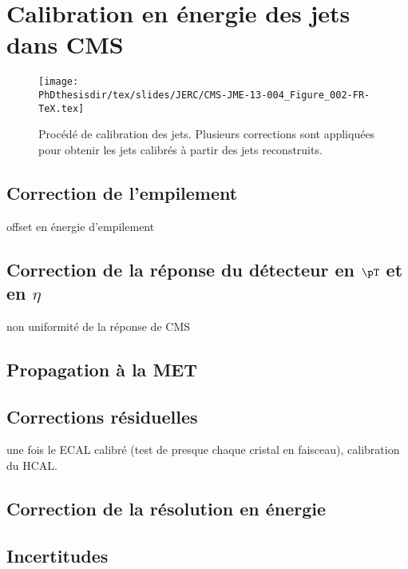 \section{Calibration en énergie des jets dans CMS}\label{chapter-JERC-section-CMS}

\begin{figure}[h]
\centering
\texttt{[image: \\PhDthesisdir/tex/slides/JERC/CMS-JME-13-004\_Figure\_002-FR-TeX.tex]}
\caption{Procédé de calibration des jets. Plusieurs corrections sont appliquées pour obtenir les jets calibrés à partir des jets reconstruits.}
\label{fig-CMS-JME-13-004_Figure_002-FR-TeX}
\end{figure}

\subsection{Correction de l'empilement}\label{chapter-JERC-section-CMS-subsec-PU}
offset en énergie d'empilement

\subsection{Correction de la réponse du détecteur en $\pT$ et en $\eta$}\label{chapter-JERC-section-CMS-subsec-reponse}
non uniformité de la réponse de CMS

\subsection{Propagation à la MET}\label{chapter-JERC-section-CMS-subsec-MET}

\subsection{Corrections résiduelles}\label{chapter-JERC-section-CMS-subsec-residuals}
une fois le ECAL calibré (test de presque chaque cristal en faisceau), calibration du HCAL.

\subsection{Correction de la résolution en énergie}\label{chapter-JERC-section-CMS-subsec-JER}

\subsection{Incertitudes}\label{chapter-JERC-section-CMS-subsec-unc}
